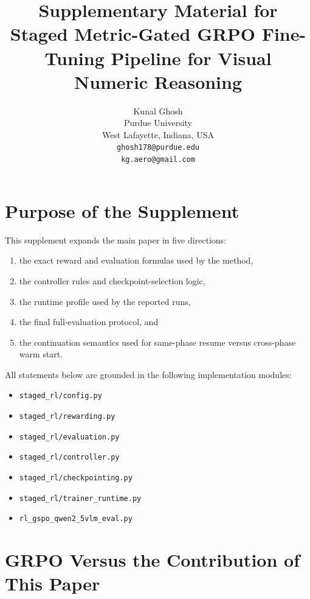 \documentclass{article} %
\title{Supplementary Material for\\Staged Metric-Gated GRPO Fine-Tuning Pipeline for Visual Numeric Reasoning}
\author{Kunal Ghosh\\
Purdue University\\
West Lafayette, Indiana, USA\\
\texttt{ghosh178@purdue.edu}\\
\texttt{kg.aero@gmail.com}}
\begin{document}
\maketitle
\fancyhead{}
\lhead{}
\chead{}
\rhead{}

\section{Purpose of the Supplement}

This supplement expands the main paper in five directions:
\begin{enumerate}[leftmargin=1.2em]
\item the exact reward and evaluation formulas used by the method,
\item the controller rules and checkpoint-selection logic,
\item the runtime profile used by the reported runs,
\item the final full-evaluation protocol, and
\item the continuation semantics used for same-phase resume versus cross-phase warm start.
\end{enumerate}
All statements below are grounded in the following implementation modules:
\begin{itemize}[leftmargin=1.2em]
\item \texttt{staged\_rl/config.py}
\item \texttt{staged\_rl/rewarding.py}
\item \texttt{staged\_rl/evaluation.py}
\item \texttt{staged\_rl/controller.py}
\item \texttt{staged\_rl/checkpointing.py}
\item \texttt{staged\_rl/trainer\_runtime.py}
\item \texttt{rl\_gspo\_qwen2\_5vlm\_eval.py}
\end{itemize}

\section{GRPO Versus the Contribution of This Paper}
\end{document}
